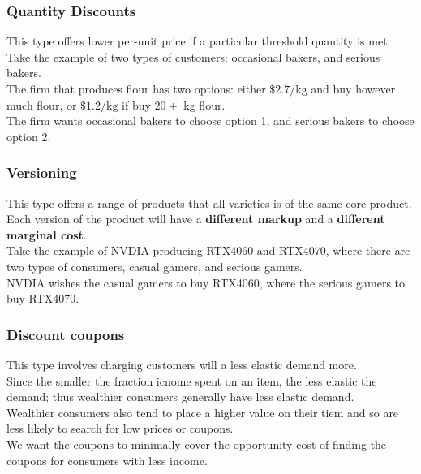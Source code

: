 \subsubsection{Quantity Discounts}
This type offers lower per-unit price if a particular threshold quantity is met. \\
Take the example of two types of customers: occasional bakers, and serious bakers. \\
The firm that produces flour has two options: either $\$2.7/\text{kg}$ and buy however much flour, or $\$1.2/\text{kg}$ if buy $20+$ kg flour. \\
The firm wants occasional bakers to choose option 1, and serious bakers to choose option 2.

\subsubsection{Versioning}
This type offers a range of products that all varieties is of the same core product. \\
Each version of the product will have a \textbf{different markup} and a \textbf{different marginal cost}. \\
Take the example of NVDIA producing RTX4060 and RTX4070, where there are two types of consumers, casual gamers, and serious gamers. \\
NVDIA wishes the casual gamers to buy RTX4060, where the serious gamers to buy RTX4070.

\subsubsection{Discount coupons}
This type involves charging customers will a less elastic demand more. \\
Since the smaller the fraction icnome spent on an item, the less elastic the demand; thus wealthier consumers generally have less elastic demand. \\
Wealthier consumers also tend to place a higher value on their tiem and so are less likely to search for low prices or coupons. \\
We want the coupons to minimally cover the opportunity cost of finding the coupons for consumers with less income.

